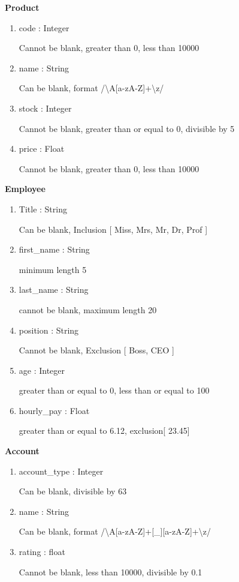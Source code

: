 \documentclass[a4paper,12pt]{article}
\begin{document}
\par \textbf{Product}
\begin{enumerate}
\item code : Integer
\par  Cannot be blank, greater than 0, less than 10000 
\item name : String
\par Can be blank, format /{\textbackslash}A[a-zA-Z]+{\textbackslash}z/
\item stock : Integer 
\par Cannot be blank, greater than or equal to 0, divisible by 5
\item price : Float 
\par Cannot be blank, greater than 0, less than 10000 
\end{enumerate}

\par \textbf{Employee}
\begin{enumerate}
\item Title : String 
\par Can be blank, Inclusion [ Miss, Mrs, Mr, Dr, Prof ]
\item first\_name : String
\par  minimum length 5 
\item last\_name : String
\par cannot be blank, maximum length 20
\item position : String 
\par Cannot be blank, Exclusion [ Boss, CEO ]
\item age : Integer 
\par greater than or equal to 0, less than or equal to 100
\item hourly\_pay : Float 
\par greater than or equal to 6.12, exclusion[ 23.45]
\end{enumerate}

\par \textbf{Account}
\begin{enumerate}
\item account\_type : Integer
\par  Can be blank, divisible by 63
\item name : String
\par Can be blank, format /{\textbackslash}A[a-zA-Z]+[\_][a-zA-Z]+{\textbackslash}z/
\item rating : float 
\par Cannot be blank, less than 10000, divisible by 0.1

\end{enumerate}
\end{document}
